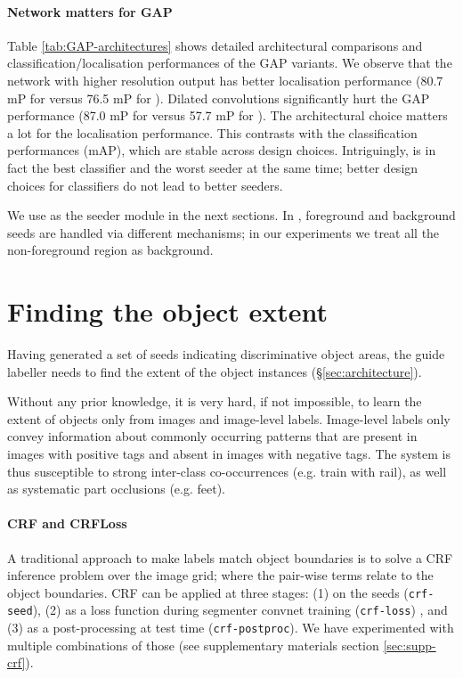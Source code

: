 \documentclass[british,10pt,twocolumn,letterpaper]{article}
\begin{document}
 
 \paragraph{Network matters for GAP}

 Table \ref{tab:GAP-architectures} shows detailed architectural comparisons
 and classification/localisation performances of the GAP variants.
 We observe that the network with higher resolution output has better
 localisation performance (80.7 mP for 
 versus 76.5 mP for ). Dilated
 convolutions significantly hurt the GAP performance (87.0 mP for 
 versus 57.7 mP for ).  The
 architectural choice matters a lot for the localisation performance.
 This contrasts with the classification performances (mAP), which are
 stable across design choices. Intriguingly, 
 is in fact the best classifier and the worst seeder at the same time;
 better design choices for classifiers do not lead to better seeders. 
 
 We use  as the seeder module
 in the next sections. In \cite{kolesnikov2016seed}, foreground and
 background seeds are handled via different mechanisms; in our experiments
 we treat all the non-foreground region as background.

\section{\label{sec:object-extent}Finding the object extent}


Having generated a set of seeds indicating discriminative object areas,
the guide labeller needs to find the extent of the object instances
(\S\ref{sec:architecture}). 

Without any prior knowledge, it is very hard, if not impossible, to
learn the extent of objects only from images and image-level labels.
Image-level labels only convey information about commonly occurring
patterns that are present in images with positive tags and absent
in images with negative tags. The system is thus susceptible to strong
inter-class co-occurrences (e.g. train with rail), as well as systematic
part occlusions (e.g. feet).


\paragraph{\label{subsec:CRF-and-CRFLoss}CRF and CRFLoss}

A traditional approach to make labels match object boundaries is to
solve a CRF inference problem \cite{Lafferty2001ICML,Kraehenbuehl2011Nips}
over the image grid; where the pair-wise terms relate to the object boundaries.
CRF can be applied at three stages: (1) on the seeds (\texttt{crf-seed}),
(2) as a loss function during segmenter convnet training (\texttt{crf-loss})
\cite{kolesnikov2016seed}, and (3) as a post-processing at test time
(\texttt{crf-postproc}). We have experimented with multiple combinations
of those (see supplementary materials section \ref{sec:supp-crf}). 
\end{document}

